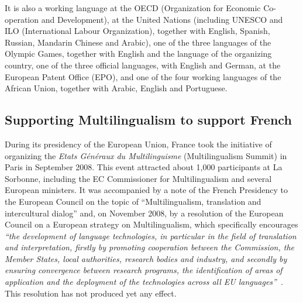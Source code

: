 \begin{multicols}{2}
It is also a working language at the OECD (Organization for Economic
Co-operation and Development), at the United Nations (including UNESCO
and ILO (International Labour Organization), together with English,
Spanish, Russian, Mandarin Chinese and Arabic), one of the three
languages of the Olympic Games, together with English and the language
of the organizing country, one of the three official languages, with
English and German, at the European Patent Office (EPO), and one of
the four working languages of the African Union, together with Arabic,
English and Portuguese.

\subsection{Supporting Multilingualism to support French}

During its presidency of the European Union, France took the
initiative of organizing the {\em Etats Généraux du Multilinguisme}
(Multilingualism Summit) in Paris in September 2008. This event
attracted about 1,000 participants at La Sorbonne, including the EC
Commissioner for Multilingualism and several European ministers. It
was accompanied by a note of the French Presidency to the European
Council on the topic of ``Multilingualism, translation and
intercultural dialog'' and, on November 2008, by a
resolution of the European Council on a European strategy on
Multilingualism, which specifically encourages {\em ``the development
  of language technologies, in particular in the field of translation
  and interpretation, firstly by promoting cooperation between the
  Commission, the Member States, local authorities, research bodies
  and industry, and secondly by ensuring convergence between research
  programs, the identification of areas of application and the
  deployment of the technologies across all EU languages''}~\cite{eurlex}. This resolution has not produced yet
any effect.


\end{multicols}
